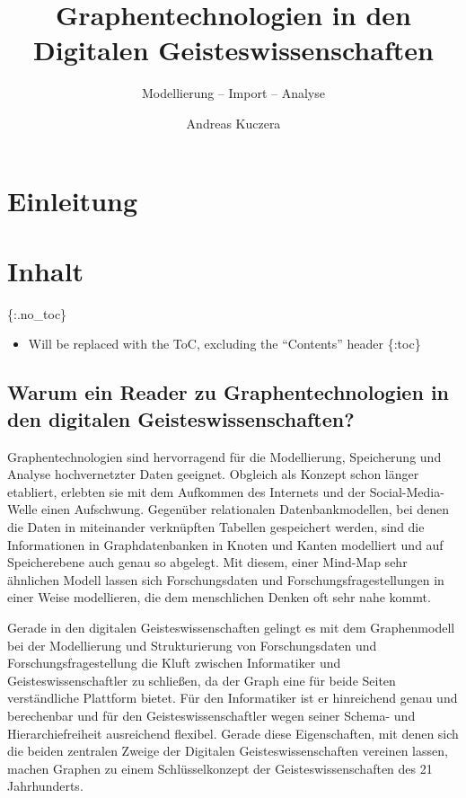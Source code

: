 \documentclass[ngerman,]{scrreprt}
\title{Graphentechnologien in den Digitalen Geisteswissenschaften}
\subtitle{Modellierung -- Import -- Analyse}
\author{Andreas Kuczera}
\date{}
\providecommand{\tightlist}{%
  \setlength{\itemsep}{0pt}\setlength{\parskip}{0pt}}
\begin{document}
\maketitle

{
\hypersetup{linkcolor=}
\setcounter{tocdepth}{2}
\tableofcontents
}
\hypertarget{einleitung}{%
\chapter{Einleitung}\label{einleitung}}

\hypertarget{inhalt}{%
\chapter{Inhalt}\label{inhalt}}

\{:.no\_toc\}

\begin{itemize}
\tightlist
\item
  Will be replaced with the ToC, excluding the ``Contents'' header \{:toc\}
\end{itemize}

\hypertarget{warum-ein-reader-zu-graphentechnologien-in-den-digitalen-geisteswissenschaften}{%
\section{Warum ein Reader zu Graphentechnologien in den digitalen Geisteswissenschaften?}\label{warum-ein-reader-zu-graphentechnologien-in-den-digitalen-geisteswissenschaften}}

Graphentechnologien sind hervorragend für die Modellierung, Speicherung und Analyse hochvernetzter Daten geeignet. Obgleich als Konzept schon länger etabliert, erlebten sie mit dem Aufkommen des Internets und der Social-Media-Welle einen Aufschwung. Gegenüber relationalen Datenbankmodellen, bei denen die Daten in miteinander verknüpften Tabellen gespeichert werden, sind die Informationen in Graphdatenbanken in Knoten und Kanten modelliert und auf Speicherebene auch genau so abgelegt. Mit diesem, einer Mind-Map sehr ähnlichen Modell lassen sich Forschungsdaten und Forschungsfragestellungen in einer Weise modellieren, die dem menschlichen Denken oft sehr nahe kommt.

Gerade in den digitalen Geisteswissenschaften gelingt es mit dem Graphenmodell bei der Modellierung und Strukturierung von Forschungsdaten und Forschungsfragestellung die Kluft zwischen Informatiker und Geisteswissenschaftler zu schließen, da der Graph eine für beide Seiten verständliche Plattform bietet. Für den Informatiker ist er hinreichend genau und berechenbar und für den Geisteswissenschaftler wegen seiner Schema- und Hierarchiefreiheit ausreichend flexibel. Gerade diese Eigenschaften, mit denen sich die beiden zentralen Zweige der Digitalen Geisteswissenschaften vereinen lassen, machen Graphen zu einem Schlüsselkonzept der Geisteswissenschaften des 21 Jahrhunderts.
\end{document}
